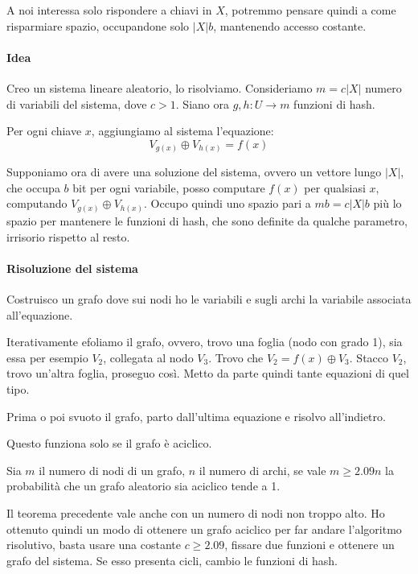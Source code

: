 A noi interessa solo rispondere a chiavi in $X$, potremmo pensare quindi a come risparmiare spazio, occupandone solo $|X|b$, mantenendo accesso costante.

\paragraph{Idea}
Creo un sistema lineare aleatorio, lo risolviamo. 
Consideriamo $m = c|X|$ numero di variabili del sistema, dove $c > 1$. Siano ora $g, h: U \longrightarrow m$ funzioni di hash.

Per ogni chiave $x$, aggiungiamo al sistema l'equazione: 
$$V_{g(x)} \oplus  V_{h(x)} = f(x)$$

Supponiamo ora di avere una soluzione del sistema, ovvero un vettore lungo $|X|$, 
che occupa $b$ bit per ogni variabile, posso computare $f(x)$ per qualsiasi $x$, 
computando $V_{g(x)} \oplus  V_{h(x)}$.
Occupo quindi uno spazio pari a $mb = c|X|b$ più lo spazio per mantenere le funzioni 
di hash, che sono definite da qualche parametro, irrisorio rispetto al resto.

\paragraph{Risoluzione del sistema}

Costruisco un grafo dove sui nodi ho le variabili e sugli archi la variabile 
associata all'equazione.

Iterativamente efoliamo il grafo, ovvero, trovo una foglia (nodo con grado 1), sia essa 
per esempio $V_2$, collegata al nodo $V_3$.
Trovo che $V_2 = f(x) \oplus V_3$.
Stacco $V_2$, trovo un'altra foglia, proseguo così. Metto da parte quindi tante equazioni 
di quel tipo.

Prima o poi svuoto il grafo, parto dall'ultima equazione e risolvo all'indietro. 

\begin{remark}
    Questo funziona solo se il grafo è aciclico.
\end{remark}

\begin{theorem}
    Sia $m$ il numero di nodi di un grafo, $n$ il numero di archi, se vale $m \geq 2.09 n$ la probabilità che un grafo aleatorio sia aciclico tende a 1.
\end{theorem}

Il teorema precedente vale anche con un numero di nodi non troppo alto. 
Ho ottenuto quindi un modo di ottenere un grafo aciclico per far andare l'algoritmo risolutivo, 
basta usare una costante $c \geq 2.09$, fissare due funzioni e ottenere un grafo 
del sistema. Se esso presenta cicli, cambio le funzioni di hash.

